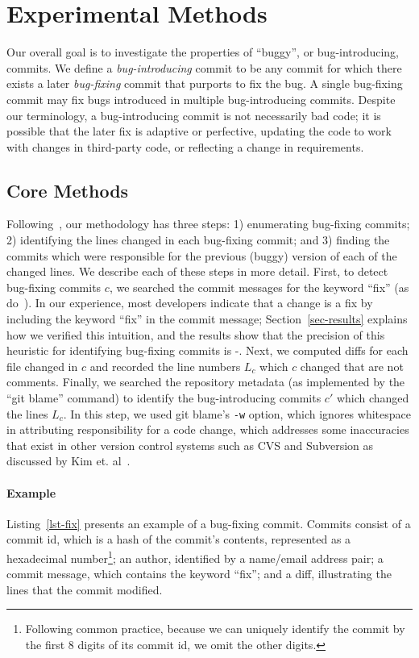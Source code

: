 \section{Experimental Methods}
\label{sec:method}
Our overall goal is to investigate the properties of ``buggy'', or
bug-introducing, commits. We define a \emph{bug-introducing} commit to
be any commit for which there exists a later \emph{bug-fixing} commit
that purports to fix the bug. A single bug-fixing commit may fix bugs
introduced in multiple bug-introducing commits. Despite our
terminology, a bug-introducing commit is not necessarily bad code; it
is possible that the later fix is adaptive or perfective, updating the
code to work with changes in third-party code, or reflecting a change
in requirements.

\subsection{Core Methods}
Following~\cite{sliwerski-msr-2005}, our methodology has three steps: 1) enumerating bug-fixing commits; 2)
identifying the lines changed in each bug-fixing commit; and 3)
finding the commits which were responsible for the previous (buggy)
version of each of the changed lines. We describe each of these steps
in more detail. First, to detect bug-fixing commits $c$, we searched
the commit messages for the keyword ``fix'' (as do~\cite{smallCommits05}). 
In our experience, most developers indicate that a change is a fix by including the keyword
``fix'' in the commit message; Section~\ref{sec-results} explains how
we verified this intuition, and the results show that the precision
of this heuristic for identifying bug-fixing commits is \postP-\linuxP. 
Next, we computed diffs for each file
changed in $c$ and recorded the line numbers $L_c$ which $c$
changed that are not comments. Finally, we searched the repository %
metadata (as implemented by the ``git blame'' command) to identify the
bug-introducing commits $c'$ which changed the lines $L_c$. In this
step, we used git blame's {\tt -w} option, which ignores whitespace in
attributing responsibility for a code change, which addresses some
inaccuracies that exist in other version control systems such as CVS
and Subversion as discussed by Kim et. al~\cite{2006-automatic}.

\paragraph{Example} Listing~\ref{lst-fix} presents an example of a
bug-fixing commit. Commits consist of a commit id, which is a hash
of the commit's contents, represented as a hexadecimal number\footnote{Following common practice, because we can uniquely identify the commit by the first 8 digits of its commit id, we omit the other digits.}; an
author, identified by a name/email address pair; a commit message,
which contains the keyword ``fix''; and a diff, illustrating the lines
that the commit modified. 

